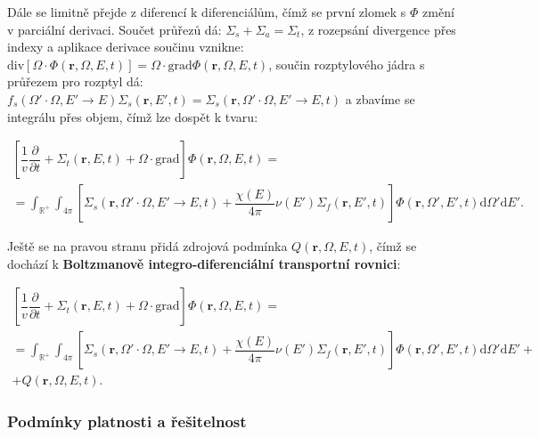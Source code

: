 Dále se limitně přejde z diferencí k diferenciálům, čímž se první zlomek s $\Phi$ změní v parciální derivaci. Součet průřezů dá: $\Sigma_s + \Sigma_a = \Sigma_t$, z rozepsání divergence přes indexy a aplikace derivace součinu vznikne: $\text{div} \left [ \Omega \cdot \Phi(\textbf{r}, \Omega, E, t) \right ] = \Omega \cdot \text{grad} \Phi(\textbf{r}, \Omega, E, t)$, součin rozptylového jádra s průřezem pro rozptyl dá: $f_s(\Omega' \cdot \Omega, E' \rightarrow E) \Sigma_s(\textbf{r}, E', t) = \Sigma_s(\textbf{r}, \Omega' \cdot \Omega, E' \rightarrow E, t)$ a zbavíme se integrálu přes objem, čímž lze dospět k tvaru:

\small
\begin{equation*}
\begin{multlined}
  \left [ \dfrac{1}{v} \dfrac{\partial}{\partial t} + \Sigma_t(\textbf{r}, E, t) + \Omega \cdot \text{grad} \right ]\Phi(\textbf{r}, \Omega, E, t) = \\
  = \int_\mathbb{R^+} \int_{4 \pi} \left [ \Sigma_s(\textbf{r}, \Omega' \cdot \Omega, E' \rightarrow E, t) + \dfrac{\chi(E)}{4 \pi} \nu(E') \Sigma_f(\textbf{r}, E', t)\right ] \Phi(\textbf{r}, \Omega', E', t) \text{d}\Omega' \text{d}E'.
\end{multlined}
\end{equation*}
\normalsize

Ještě se na pravou stranu přidá zdrojová podmínka $Q(\textbf{r}, \Omega, E, t)$, čímž se dochází k \textbf{Boltzmanově integro-diferenciální transportní rovnici}:

\begin{equation}
  \boxed{
  \begin{multlined}
    \left [ \dfrac{1}{v} \dfrac{\partial}{\partial t} + \Sigma_t(\textbf{r}, E, t) + \Omega \cdot \text{grad} \right ]\Phi(\textbf{r}, \Omega, E, t) = \\
    = \int_\mathbb{R^+} \int_{4 \pi} \left [ \Sigma_s(\textbf{r}, \Omega' \cdot \Omega, E' \rightarrow E, t) + \dfrac{\chi(E)}{4 \pi} \nu(E') \Sigma_f(\textbf{r}, E', t)\right ] \Phi(\textbf{r}, \Omega', E', t) \text{d}\Omega' \text{d}E' + \\
    + Q(\textbf{r}, \Omega, E, t).
  \end{multlined}}
  \label{integro-diferencialni_transportka}
\end{equation}

\subsubsection{Podmínky platnosti a řešitelnost}

